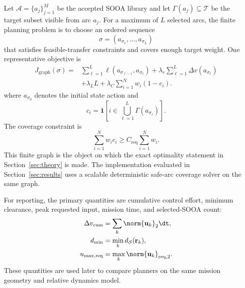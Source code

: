 Let $\mathcal A=\{a_j\}_{j=1}^{M}$ be the accepted SOOA library and let
$\Gamma(a_j)\subseteq\mathcal T$ be the target subset visible from arc $a_j$.
For a maximum of $L$ selected arcs, the finite planning problem is to choose an
ordered sequence
\begin{equation}
  \sigma=(a_{\sigma_1},\ldots,a_{\sigma_L})
\end{equation}
that satisfies feasible-transfer constraints and covers enough target weight.
One representative objective is
\begin{equation}
  \begin{aligned}
  J_{\mathrm{graph}}(\sigma)={}&
  \sum_{\ell=1}^{L}\ell(a_{\sigma_{\ell-1}},a_{\sigma_\ell})
  + \lambda_v\sum_{\ell=1}^{L}\Delta v(a_{\sigma_\ell})\\
  &+\lambda_L L
  +\lambda_C\sum_{i=1}^{N}w_i(1-c_i).
  \end{aligned}
\end{equation}
where $a_{\sigma_0}$ denotes the initial state action and
\begin{equation}
  c_i = \mathbf{1}\left[
  i\in \bigcup_{\ell=1}^{L}\Gamma(a_{\sigma_\ell})\right].
\end{equation}
The coverage
constraint is
\begin{equation}
  \sum_{i=1}^{N}w_i c_i
  \ge C_{\mathrm{req}}\sum_{i=1}^{N}w_i .
\end{equation}
This finite graph is the object on which the exact optimality statement in
Section~\ref{sec:theory} is made. The implementation evaluated in
Section~\ref{sec:results} uses a scalable deterministic safe-arc coverage
solver on the same graph.

For reporting, the primary quantities are cumulative control effort, minimum
clearance, peak requested input, mission time, and selected-SOOA count:
\begin{align}
  \Delta v_{\mathrm{cum}} &= \sum_k \norm{\mathbf{u}_k}_2\dt,\\
  d_{\min} &= \min_k d_{\mathcal S}(\mathbf{r}_k),\\
  u_{\max,\mathrm{req}} &= \max_k \norm{\mathbf{u}_k}_{\mathrm{req},2}.
\end{align}
These quantities are used later to compare planners on the same mission
geometry and relative dynamics model.
